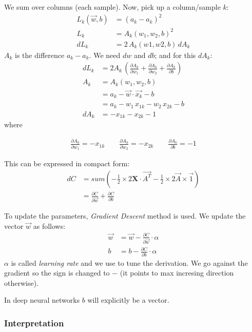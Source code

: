 We sum over columns (each sample). Now, pick up a column/sample $k$:
\begin{align*}
  L_k(\vec{w},b) &= (a_k - \hat{a}_k)^2\\
    L_k &= A_k(w_1, w_2, b)^2\\
    dL_k &= 2\,A_k(w1,w2,b)\,dA_k
\end{align*}
$A_k$ is the difference $a_k-\hat{a}_k$. We need $dw$ and $db$; and for this $dA_k$:
\begin{align*}
  dL_k  &= 2A_k\,(\frac{\partial A_k}{\partial w_1} + \frac{\partial A_k}{\partial w_2} + \frac{\partial A_k}{\partial b}) \\
  A_k &= A_k(w_1, w_2, b)\\
  &= a_k - \vec{w}\cdot{}\vec{x_k} - b\\
  &= a_k - w_1\,x_{1k} - w_2\,x_{2k}-b\\
  dA_k &= -x_{1k} - x_{2k} -1
\end{align*}
where 
\begin{center}
\begin{align*}
  \frac{\partial A_{k}}{\partial w_1} = -x_{1k}\hspace{2em} \frac{\partial A_{k}}{\partial w_2} = -x_{2k}\hspace{2em} \frac{\partial A_k}{\partial b} = -1
\end{align*} 
\end{center}

This can be expressed in compact form:
\begin{align*}
  dC &= sum(-\frac{1}{2}\times{}2\mathbf{X}\cdot{}\vec{A^T}-\frac{1}{2}\times{}2\vec{A}\times{}\vec{1})\\
  &= \frac{\partial C}{\partial \vec{w}} + \frac{\partial C}{\partial b} 
\end{align*}

To update the parameters, \textit{Gradient Descent} method is used. We update the vector $\vec{w}$ as follows:
\begin{align}
  \vec{w} &= \vec{w} -\frac{\partial C}{\partial \vec{w}}\cdot{}\alpha\\
  b &= b -\frac{\partial C}{\partial b}\cdot{}\alpha
\end{align}
$\alpha$ is called \textit{learning rate} and we use to tune the derivation. We go against the gradient so the sign is changed to $-$ (it points to max incresing direction otherwise).

In deep neural networks $b$ will explicitly be a vector.

\subsubsection{Interpretation}

